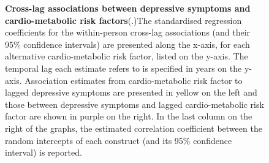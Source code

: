 \documentclass[
  letterpaper,
  DIV=11,
  numbers=noendperiod]{scrreport}
\begin{document}
\begin{figure}[H]


\caption{\label{fig-6.3}\textbf{Cross-lag associations between
depressive symptoms and cardio-metabolic risk factors}\newline(.)The
standardised regression coefficients for the within-person cross-lag
associations (and their 95\% confidence intervals) are presented along
the x-axis, for each alternative cardio-metabolic risk factor, listed on
the y-axis. The temporal lag each estimate refers to is specified in
years on the y-axis. Association estimates from cardio-metabolic risk
factor to lagged depressive symptoms are presented in yellow on the left
and those between depressive symptoms and lagged cardio-metabolic risk
factor are shown in purple on the right. In the last column on the right
of the graphs, the estimated correlation coefficient between the random
intercepts of each construct (and its 95\% confidence interval) is
reported.}

\end{figure}%
\end{document}
